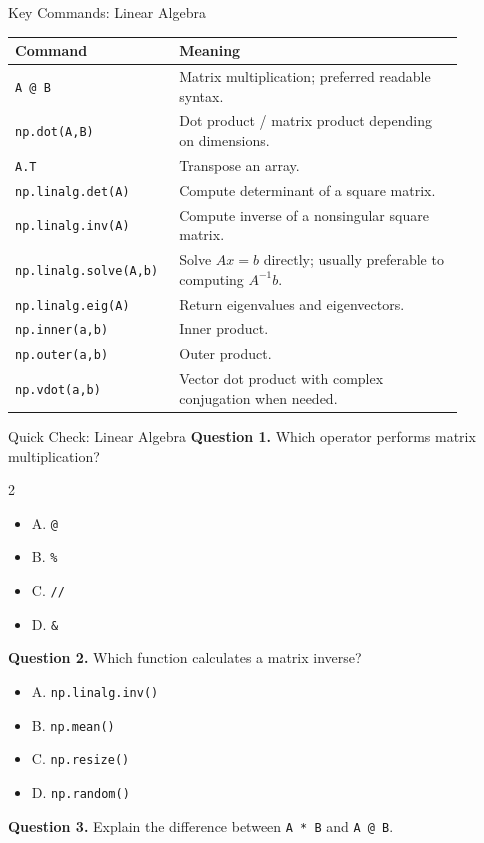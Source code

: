 \documentclass[aspectratio=169,11pt]{beamer}
\newcommand{\quiztitle}[1]{\textbf{\textcolor{QuizOrange}{#1}}}
\begin{document}
\begin{frame}{Key Commands: Linear Algebra}
\scriptsize
\begin{tabular}{p{0.29\linewidth}p{0.60\linewidth}}
\toprule
\textbf{Command} & \textbf{Meaning} \\
\midrule
\texttt{A @ B} & Matrix multiplication; preferred readable syntax. \\
\texttt{np.dot(A,B)} & Dot product / matrix product depending on dimensions. \\
\texttt{A.T} & Transpose an array. \\
\texttt{np.linalg.det(A)} & Compute determinant of a square matrix. \\
\texttt{np.linalg.inv(A)} & Compute inverse of a nonsingular square matrix. \\
\texttt{np.linalg.solve(A,b)} & Solve \(Ax=b\) directly; usually preferable to computing \(A^{-1}b\). \\
\texttt{np.linalg.eig(A)} & Return eigenvalues and eigenvectors. \\
\texttt{np.inner(a,b)} & Inner product. \\
\texttt{np.outer(a,b)} & Outer product. \\
\texttt{np.vdot(a,b)} & Vector dot product with complex conjugation when needed. \\
\bottomrule
\end{tabular}
\end{frame}

\begin{frame}{Quick Check: Linear Algebra}
\small
\quiztitle{Question 1.} Which operator performs matrix multiplication?
\begin{multicols}{2}
\begin{itemize}
  \item A. \texttt{@}
  \item B. \texttt{\%}
  \item C. \texttt{//}
  \item D. \texttt{\&}
\end{itemize}
\end{multicols}
\quiztitle{Question 2.} Which function calculates a matrix inverse?
\begin{itemize}
  \item A. \texttt{np.linalg.inv()}
  \item B. \texttt{np.mean()}
  \item C. \texttt{np.resize()}
  \item D. \texttt{np.random()}
\end{itemize}
\quiztitle{Question 3.} Explain the difference between \texttt{A * B} and \texttt{A @ B}.
\end{frame}
\end{document}
